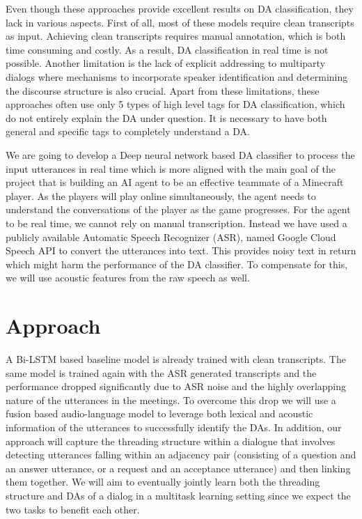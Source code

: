 Even though these approaches provide excellent results on DA classification,
they lack in various aspects. First of all, most of these models require clean
transcripts as input. Achieving clean transcripts requires manual annotation,
which is both time consuming and costly. As a result, DA classification in real
time is not possible. Another limitation is the lack of explicit addressing to
multiparty dialogs where mechanisms to incorporate speaker identification and
determining the discourse structure is also crucial. Apart from these
limitations, these approaches often use only 5 types of high level tags for DA
classification, which do not entirely explain the DA under question. It is
necessary to have both general and specific tags to completely understand a DA.

We are going to develop a Deep neural network based DA classifier to process
the input utterances in real time which is more aligned with the main goal of
the project that is building an AI agent to be an effective teammate of a
Minecraft player. As the players will play online simultaneously, the agent
needs to understand the conversations of the player as the game progresses. For
the agent to be real time, we cannot rely on manual transcription. Instead we
have used a publicly available Automatic Speech Recognizer (ASR), named Google
Cloud Speech API to convert the utterances into text. This provides noisy text
in return which might harm the performance of the DA classifier. To compensate
for this, we will use acoustic features from the raw speech as well.

\section{Approach}
A Bi-LSTM based baseline model is already trained with clean transcripts. The
same model is trained again with the ASR generated transcripts and the
performance dropped significantly due to ASR noise and the highly overlapping
nature of the utterances in the meetings. To overcome this drop we will use a
fusion based audio-language model to leverage both lexical and acoustic
information of the utterances to successfully identify the DAs. In addition,
our approach will capture the threading structure within a dialogue that
involves detecting utterances falling within an adjacency pair (consisting of a
question and an answer utterance, or a request and an acceptance utterance) and
then linking them together. We will aim to eventually jointly learn both the
threading structure and DAs of a dialog in a multitask learning setting since
we expect the two tasks to benefit each other.

